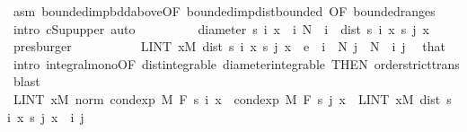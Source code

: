 \begin{isabellebody}
\ asm\ bounded{\isacharunderscore}{\kern0pt}imp{\isacharunderscore}{\kern0pt}bdd{\isacharunderscore}{\kern0pt}above{\isacharbrackleft}{\kern0pt}OF\ bounded{\isacharunderscore}{\kern0pt}imp{\isacharunderscore}{\kern0pt}dist{\isacharunderscore}{\kern0pt}bounded{\isacharcomma}{\kern0pt}\ OF\ bounded{\isacharunderscore}{\kern0pt}range{\isacharunderscore}{\kern0pt}s{\isacharbrackright}{\kern0pt}\ \isamarkupfalse%
\ {\isacharparenleft}{\kern0pt}intro\ cSup{\isacharunderscore}{\kern0pt}upper{\isacharcomma}{\kern0pt}\ auto{\isacharparenright}{\kern0pt}\isanewline
\ \ \ \ \ \ \isamarkupfalse%
\ \isamarkupfalse%
\ {\isachardoublequoteopen}diameter\ {\isacharbraceleft}{\kern0pt}s\ i\ x\ {\isacharbar}{\kern0pt}\ i{\isachardot}{\kern0pt}\ N\ {\isasymle}\ i{\isacharbraceright}{\kern0pt}\ {\isasymge}\ dist\ {\isacharparenleft}{\kern0pt}s\ i\ x{\isacharparenright}{\kern0pt}\ {\isacharparenleft}{\kern0pt}s\ j\ x{\isacharparenright}{\kern0pt}{\isachardoublequoteclose}\ \isamarkupfalse%
\ presburger\isanewline
\ \ \ \ \isacommand{{\isacharbraceright}{\kern0pt}}\isamarkupfalse%
\isanewline
\ \ \ \ \isamarkupfalse%
\ {\isachardoublequoteopen}LINT\ x{\isacharbar}{\kern0pt}M{\isachardot}{\kern0pt}\ dist\ {\isacharparenleft}{\kern0pt}s\ i\ x{\isacharparenright}{\kern0pt}\ {\isacharparenleft}{\kern0pt}s\ j\ x{\isacharparenright}{\kern0pt}\ {\isacharless}{\kern0pt}\ e{\isachardoublequoteclose}\ \ {\isachardoublequoteopen}i\ {\isasymge}\ N{\isachardoublequoteclose}\ {\isachardoublequoteopen}j\ {\isasymge}\ N{\isachardoublequoteclose}\ \ i\ j\ \isamarkupfalse%
\ that\ {\isacharasterisk}{\kern0pt}\ \isamarkupfalse%
\ {\isacharparenleft}{\kern0pt}intro\ integral{\isacharunderscore}{\kern0pt}mono{\isacharbrackleft}{\kern0pt}OF\ dist{\isacharunderscore}{\kern0pt}integrable\ diameter{\isacharunderscore}{\kern0pt}integrable{\isacharcomma}{\kern0pt}\ THEN\ order{\isachardot}{\kern0pt}strict{\isacharunderscore}{\kern0pt}trans{}{\isacharbrackright}{\kern0pt}{\isacharcomma}{\kern0pt}\ blast{\isacharplus}{\kern0pt}{\isacharparenright}{\kern0pt}\isanewline
\ \ \ \ \isamarkupfalse%
\ \isamarkupfalse%
\ {\isachardoublequoteopen}LINT\ x{\isacharbar}{\kern0pt}M{\isachardot}{\kern0pt}\ norm\ {\isacharparenleft}{\kern0pt}cond{\isacharunderscore}{\kern0pt}exp\ M\ F\ {\isacharparenleft}{\kern0pt}s\ i{\isacharparenright}{\kern0pt}\ x\ {\isacharminus}{\kern0pt}\ cond{\isacharunderscore}{\kern0pt}exp\ M\ F\ {\isacharparenleft}{\kern0pt}s\ j{\isacharparenright}{\kern0pt}\ x{\isacharparenright}{\kern0pt}\ {\isasymle}\ LINT\ x{\isacharbar}{\kern0pt}M{\isachardot}{\kern0pt}\ dist\ {\isacharparenleft}{\kern0pt}s\ i\ x{\isacharparenright}{\kern0pt}\ {\isacharparenleft}{\kern0pt}s\ j\ x{\isacharparenright}{\kern0pt}{\isachardoublequoteclose}\ \ i\ j\isanewline

\end{isabellebody}
